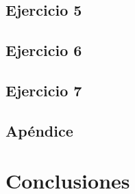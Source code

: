 \documentclass[a4paper]{article}
\begin{document}
\newpage

\subsection{Ejercicio 5}
	

\newpage

\subsection{Ejercicio 6}
	
        
\newpage

\subsection{Ejercicio 7}
	

\newpage

\subsection{Apéndice}
	
	
\newpage

\section{Conclusiones}
	
\end{document}
